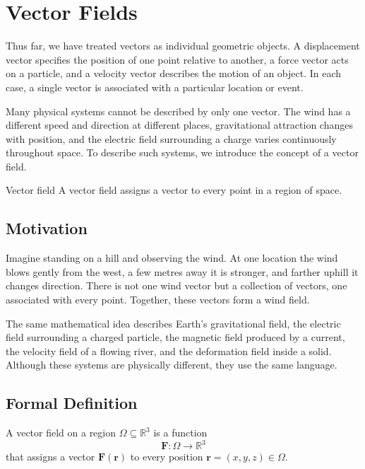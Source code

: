 \section{Vector Fields}
\label{sec:vector-fields}

Thus far, we have treated vectors as individual geometric objects. A
displacement vector specifies the position of one point relative to another, a
force vector acts on a particle, and a velocity vector describes the motion of
an object. In each case, a single vector is associated with a particular
location or event.

Many physical systems cannot be described by only one vector. The wind has a
different speed and direction at different places, gravitational attraction
changes with position, and the electric field surrounding a charge varies
continuously throughout space. To describe such systems, we introduce the
concept of a vector field.

\begin{definitionbox}{Vector field}
A vector field assigns a vector to every point in a region of space.
\end{definitionbox}

\subsection{Motivation}

Imagine standing on a hill and observing the wind. At one location the wind
blows gently from the west, a few metres away it is stronger, and farther uphill
it changes direction. There is not one wind vector but a collection of vectors,
one associated with every point. Together, these vectors form a wind field.

The same mathematical idea describes Earth's gravitational field, the electric
field surrounding a charged particle, the magnetic field produced by a current,
the velocity field of a flowing river, and the deformation field inside a solid.
Although these systems are physically different, they use the same language.

\subsection{Formal Definition}

A vector field on a region $\Omega\subseteq\mathbb R^3$ is a function
\[
\boxed{
\mathbf F:\Omega\longrightarrow\mathbb R^3
}
\]
that assigns a vector $\mathbf F(\mathbf r)$ to every position
$\mathbf r=(x,y,z)\in\Omega$.

